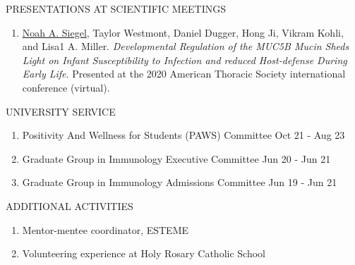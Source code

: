 \documentclass{resume} %
\begin{document}
\begin{rSection}{PRESENTATIONS AT SCIENTIFIC MEETINGS}
\begin{enumerate}
\item \underline{Noah A. Siegel}, Taylor Westmont, Daniel Dugger, Hong Ji, Vikram Kohli, and Lisa1 A. Miller. \emph{Developmental Regulation of the MUC5B Mucin Sheds Light on Infant Susceptibility to Infection and reduced Host-defense During Early Life}. Presented at the 2020 American Thoracic Society international conference (virtual).

\end{enumerate}
\end{rSection}



\begin{rSection}{UNIVERSITY SERVICE}
\begin{enumerate}

\item Positivity And Wellness for Students (PAWS) Committee
\hfill Oct 21 - Aug 23
\item Graduate Group in Immunology Executive Committee
\hfill Jun 20 - Jun 21
\item Graduate Group in Immunology Admissions Committee
\hfill Jun 19 - Jun 21

\end{enumerate}
\end{rSection}

\begin{rSection}{ADDITIONAL ACTIVITIES} \itemsep -3pt
\begin{enumerate}

\item Mentor-mentee coordinator, ESTEME
\item Volunteering experience at Holy Rosary Catholic School

\end{enumerate}
\end{rSection}
\end{document}
